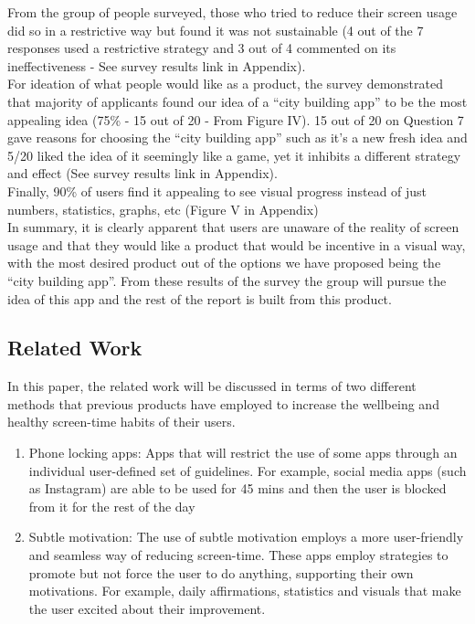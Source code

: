 \documentclass[sigconf, 11pt]{acmart}
\begin{document}
From the group of people surveyed, those who tried to reduce their screen usage did so in a restrictive way but found it was not sustainable (4 out of the 7 responses used a restrictive strategy and 3 out of 4 commented on its ineffectiveness - See survey results link in Appendix).
\\

For ideation of what people would like as a product, the survey demonstrated that majority of applicants found our idea of a “city building app” to be the most appealing idea (75\% - 15 out of 20 - From Figure IV). 15 out of 20 on Question 7 gave reasons for choosing the “city building app” such as it's a new fresh idea and 5/20 liked the idea of it seemingly like a game, yet it inhibits a different strategy and effect (See survey results link in Appendix).
\\

Finally, 90\% of users find it appealing to see visual progress instead of just numbers, statistics, graphs, etc (Figure V in Appendix)
\\

In summary, it is clearly apparent that users are unaware of the reality of screen usage and that they would like a product that would be incentive in a visual way, with the most desired product out of the options we have proposed being the “city building app”. From these results of the survey the group will pursue the idea of this app and the rest of the report is built from this product.

\subsection{Related Work}
In this paper, the related work will be discussed in terms of two different methods that previous products have employed to increase the wellbeing and healthy screen-time habits of their users.
\begin{enumerate}
    \item Phone locking apps: Apps that will restrict the use of some apps through an individual user-defined set of guidelines. For example, social media apps (such as Instagram) are able to be used for 45 mins and then the user is blocked from it for the rest of the day

    \item Subtle motivation: The use of subtle motivation employs a more user-friendly and seamless way of reducing screen-time. These apps employ strategies to promote but not force the user to do anything, supporting their own motivations. For example, daily affirmations, statistics and visuals that make the user excited about their improvement. 
\end{enumerate}
\end{document}
